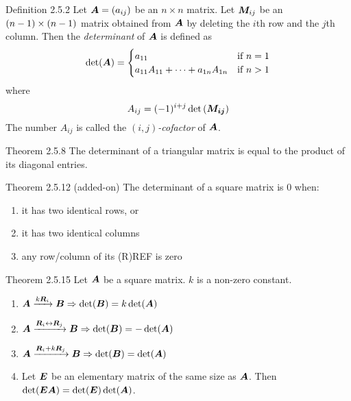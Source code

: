 \documentclass[11pt,landscape]{article}
\begin{document}
\begin{multicols}{2}
\begin{justifying}
\begin{namedthm*}{Definition 2.5.2}
    Let \(\bm{A} = \left(a_{ij}\right)\) be an \(n \times n\) matrix. Let \(\bm{M}_{ij}\) be an \(\nobreak{(n - 1)\times (n - 1)}\) matrix obtained from \(\bm{A}\) by deleting the \(i\)th row and the \(j\)th column. Then the \textit{determinant} of \(\bm{A}\) is defined as
    \[
        \det(\bm{A}) =
            \begin{cases}
                a_{11} & \text{if \(n = 1\)} \\
                a_{11}A_{11} + \cdots + a_{1n}A_{1n} & \text{if \(n > 1\)}
            \end{cases}
    \]
    where
    \[
        A_{ij} = (-1)^{i + j} \det\left(\bm{M_{ij}}\right)
    \]
    The number \(A_{ij}\) is called the \((i, j)\)\textit{-cofactor} of \(\bm{A}\).
\end{namedthm*}

\begin{namedthm*}{Theorem 2.5.8}
    The determinant of a triangular matrix is equal to the product of its diagonal entries.
\end{namedthm*}

\begin{namedthm*}{Theorem 2.5.12 (added-on)}
	The determinant of a square matrix is 0 when:
	\begin{enumerate}
		\item it has two identical rows, or
		\item it has two identical columns
		\item any row/column of its (R)REF is zero
	\end{enumerate}
\end{namedthm*}

\begin{namedthm*}{Theorem 2.5.15}
    Let \(\bm{A}\) be a square matrix. \(k\) is a non-zero constant.
    \begin{enumerate}
    	\item \(\bm{A} \xrightarrow{k\bm{R}_i} \bm{B} \Rightarrow \det(\bm{B}) = k\det(\bm{A})\)
    	\item \(\bm{A} \xrightarrow{\bm{R}_i \leftrightarrow \bm{R}_j} \bm{B} \Rightarrow \det(\bm{B}) = -\det(\bm{A})\)
    	\item \(\bm{A} \xrightarrow{\bm{R}_i + k\bm{R}_j} \bm{B} \Rightarrow \det(\bm{B}) = \det(\bm{A})\)
        \item Let \(\bm{E}\) be an elementary matrix of the same size as \(\bm{A}\). Then \(\det(\bm{EA}) = \det(\bm{E})\det(\bm{A})\).
    \end{enumerate}
\end{namedthm*}


\end{justifying}
\end{multicols}
\end{document}
